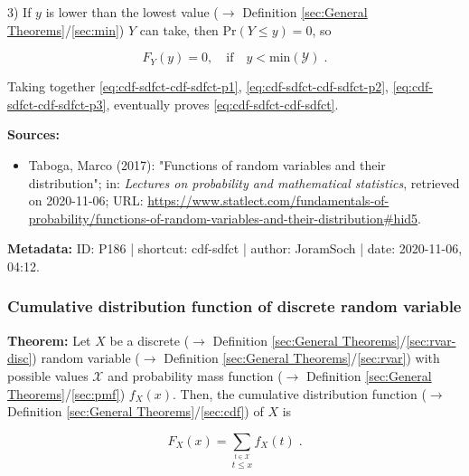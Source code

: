 \documentclass[a4paper,12pt,twoside]{book}
\begin{document}
3) If $y$ is lower than the lowest value ($\rightarrow$ Definition \ref{sec:General Theorems}/\ref{sec:min}) $Y$ can take, then $\mathrm{Pr}(Y \leq y) = 0$, so

\begin{equation} \label{eq:cdf-sdfct-cdf-sdfct-p3}
F_Y(y) = 0, \quad \text{if} \quad y < \mathrm{min}(\mathcal{Y}) \; .
\end{equation}

Taking together \eqref{eq:cdf-sdfct-cdf-sdfct-p1}, \eqref{eq:cdf-sdfct-cdf-sdfct-p2}, \eqref{eq:cdf-sdfct-cdf-sdfct-p3}, eventually proves \eqref{eq:cdf-sdfct-cdf-sdfct}.


\vspace{1em}
\textbf{Sources:}
\begin{itemize}
\item Taboga, Marco (2017): "Functions of random variables and their distribution"; in: \textit{Lectures on probability and mathematical statistics}, retrieved on 2020-11-06; URL: \url{https://www.statlect.com/fundamentals-of-probability/functions-of-random-variables-and-their-distribution#hid5}.
\end{itemize}


\vspace{1em}
\textbf{Metadata:} ID: P186 | shortcut: cdf-sdfct | author: JoramSoch | date: 2020-11-06, 04:12.
\vspace{1em}



\subsubsection[\textbf{Cumulative distribution function of discrete random variable}]{Cumulative distribution function of discrete random variable} \label{sec:cdf-pmf}
\setcounter{equation}{0}

\textbf{Theorem:} Let $X$ be a discrete ($\rightarrow$ Definition \ref{sec:General Theorems}/\ref{sec:rvar-disc}) random variable ($\rightarrow$ Definition \ref{sec:General Theorems}/\ref{sec:rvar}) with possible values $\mathcal{X}$ and probability mass function ($\rightarrow$ Definition \ref{sec:General Theorems}/\ref{sec:pmf}) $f_X(x)$. Then, the cumulative distribution function ($\rightarrow$ Definition \ref{sec:General Theorems}/\ref{sec:cdf}) of $X$ is

\begin{equation} \label{eq:cdf-pmf-cdf-pmf}
F_X(x) = \sum_{\overset{t \in \mathcal{X}}{t \leq x}} f_X(t) \; .
\end{equation}
\end{document}

